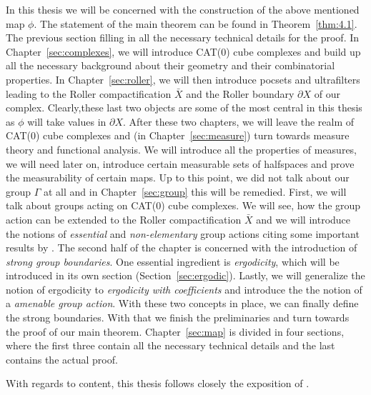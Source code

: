In this thesis we will be concerned with the construction of the above mentioned map \(\phi\). The statement of the main theorem can be found in Theorem~\ref{thm:4.1}. The previous section filling in all the necessary technical details for the proof. In Chapter~\ref{sec:complexes}, we will introduce CAT(0) cube complexes and build up all the necessary background about their geometry and their combinatorial properties. In Chapter~\ref{sec:roller}, we will then introduce pocsets and ultrafilters leading to the Roller compactification \(\bar X\) and the Roller boundary \(\partial X\) of our complex. Clearly,these last two objects are some of the most central in this thesis as \(\phi\) will take values in \(\partial X\). After these two chapters, we will leave the realm of CAT(0) cube complexes and (in Chapter~\ref{sec:measure}) turn towards measure theory and functional analysis. We will introduce all the properties of measures, we will need later on, introduce certain measurable sets of halfspaces and prove the measurability of certain maps. Up to this point, we did not talk about our group \(\Gamma\) at all and in Chapter~\ref{sec:group} this will be remedied. First, we will talk about groups acting on CAT(0) cube complexes. We will see, how the group action can be extended to the Roller compactification \(\bar X\) and we will introduce the notions of \emph{essential} and \emph{non-elementary} group actions citing some important results by \textcite{Caprace2010}. The second half of the chapter is concerned with the introduction of \emph{strong group boundaries}. One essential ingredient is \emph{ergodicity}, which will be introduced in its own section (Section~\ref{sec:ergodic}). Lastly, we will generalize the notion of ergodicity to \emph{ergodicity with coefficients} and introduce the the notion of a \emph{amenable group action}. With these two concepts in place, we can finally define the strong boundaries. With that we finish the preliminaries and turn towards the proof of our main theorem. Chapter~\ref{sec:map} is divided in four sections, where the first three contain all the necessary technical details and the last contains the actual proof. 

With regards to content, this thesis follows closely the exposition of \textcite{MR3509968}.
